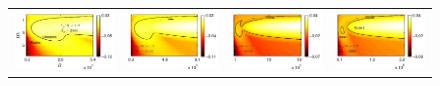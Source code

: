 \documentclass[aps,prl,twocolumn,showpacs,superscriptaddress,groupedaddress,10pt]{revtex4-1}  %
\begin{document}
\begin{figure}
\begin{tabular}{cccc}
{\includegraphics[scale = 0.72]{Set6_dens32_imgsc}} &
{\includegraphics[scale = 0.72]{Set6_dens34_imgsc}} &
{\includegraphics[scale = 0.72]{Set6_dens36_imgsc}} &
{\includegraphics[scale = 0.72]{Set6_dens38_imgsc}}
\end{tabular}


\end{figure}
\end{document}
